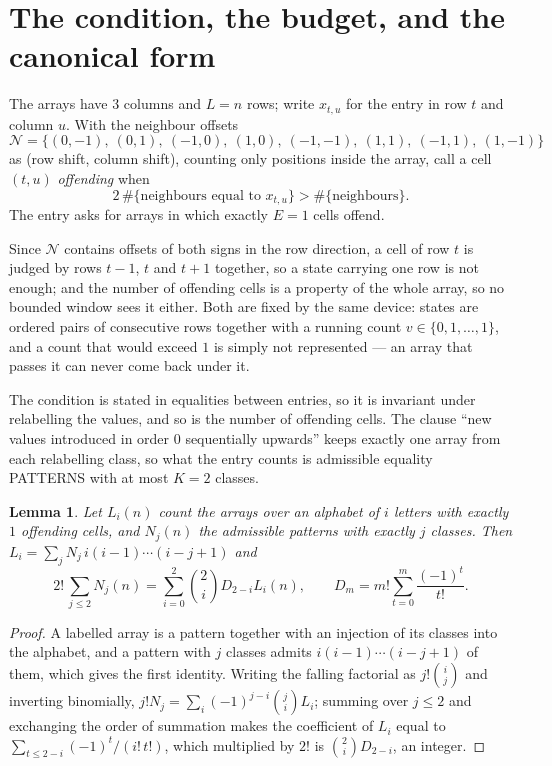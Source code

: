 \documentclass[11pt,a4paper]{article}
\theoremstyle{plain}
\newtheorem{lemma}[theorem]{Lemma}
\theoremstyle{definition}
\begin{document}
\section{The condition, the budget, and the canonical form}

The arrays have $3$ columns and $L=n$ rows; write $x_{t,u}$ for the entry in
row $t$ and column $u$. With the neighbour offsets
\[
\mathcal N=\{(0,-1),\ (0,1),\ (-1,0),\ (1,0),\ (-1,-1),\ (1,1),\ (-1,1),\ (1,-1)\}
\]
as (row shift, column shift), counting only positions inside the array, call a cell
$(t,u)$ \emph{offending} when
\[
2\,\#\{\text{neighbours equal to }x_{t,u}\}>\#\{\text{neighbours}\} .
\]
The entry asks for arrays in which exactly $E=1$ cells offend.

Since $\mathcal N$ contains offsets of both signs in the row direction, a cell of row
$t$ is judged by rows $t-1$, $t$ and $t+1$ together, so a state carrying one row is not
enough; and the number of offending cells is a property of the whole array, so no bounded
window sees it either. Both are fixed by the same device: states are ordered pairs of
consecutive rows together with a running count $v\in\{0,1,\dots,1\}$, and a count that
would exceed $1$ is simply not represented --- an array that passes it can never come back
under it.

The condition is stated in equalities between entries, so it is invariant under relabelling
the values, and so is the number of offending cells. The clause ``new values introduced in
order $0$ sequentially upwards'' keeps exactly one array from each relabelling class, so what
the entry counts is admissible equality PATTERNS with at most $K=2$ classes.

\begin{lemma}\label{lem:inv}
Let $L_i(n)$ count the arrays over an alphabet of $i$ letters with exactly $1$ offending
cells, and $N_j(n)$ the admissible patterns with exactly $j$ classes. Then
$L_i=\sum_j N_j\,i(i-1)\cdots(i-j+1)$ and
\[
2!\,\sum_{j\le2}N_j(n)=\sum_{i=0}^{2}\binom{2}{i}D_{2-i}L_i(n),
\qquad D_m=m!\sum_{t=0}^{m}\frac{(-1)^t}{t!} .
\]
\end{lemma}

\begin{proof}
A labelled array is a pattern together with an injection of its classes into the alphabet,
and a pattern with $j$ classes admits $i(i-1)\cdots(i-j+1)$ of them, which gives the first
identity. Writing the falling factorial as $j!\binom{i}{j}$ and inverting binomially,
$j!N_j=\sum_i(-1)^{j-i}\binom{j}{i}L_i$; summing over $j\le2$ and exchanging the
order of summation makes the coefficient of $L_i$ equal to
$\sum_{t\le2-i}(-1)^t/(i!\,t!)$, which multiplied by $2!$ is
$\binom{2}{i}D_{2-i}$, an integer.
\end{proof}
\end{document}
